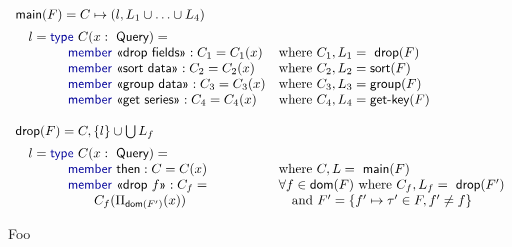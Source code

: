 \documentclass[a4paper,UKenglish]{lipics-v2016}
\newcommand{\kvd}[1]{\textnormal{\textcolor{kvdclr}{\sffamily #1}}}
\newcommand{\ident}[1]{\textnormal{\sffamily #1}}
\newcommand{\qident}[1]{\textnormal{\sffamily \guillemotleft #1\guillemotright}}
\newcommand{\dom}{\ident{dom}}
\begin{document}
\begin{figure}
\begin{equation*}
\begin{array}{ll}
\ident{main}(F) = C \mapsto (l, L_1 \cup \ldots \cup L_4)\\[0.5em]
\quad l = \kvd{type}~C(x:\ident{Query}) = \\
\qquad \qquad \kvd{member}~\qident{drop fields} : C_1 = C_1(x) &\textnormal{where}~C_1, L_1 = \ident{drop}(F)\\
\qquad \qquad \kvd{member}~\qident{sort data} : C_2 = C_2(x) &\textnormal{where}~C_2, L_2 = \ident{sort}(F)\\
\qquad \qquad \kvd{member}~\qident{group data} : C_3 = C_3(x) &\textnormal{where}~C_3, L_3 = \ident{group}(F)\\
\qquad \qquad \kvd{member}~\qident{get series} : C_4 = C_4(x) &\textnormal{where}~C_4, L_4 = \ident{get-key}(F)\\
\\
\ident{drop}(F) = C, \{l\} \cup \bigcup L_f\\[0.5em]
\quad l = \kvd{type}~C(x:\ident{Query}) = \\
\qquad \qquad \kvd{member}~\ident{then} : C = C(x)                 &\textnormal{where}~C, L = \ident{main}(F)\\
\qquad \qquad \kvd{member}~\qident{drop $f$} : C_f = &\forall f \in \dom(F)~\textnormal{where}~C_f, L_f = \ident{drop}(F')\\
\qquad \qquad \qquad  C_f(\Pi_{\ident{dom}(F')}(x))& \quad\textnormal{and}~ F' = \{ f'\mapsto\tau'\in F, f' \neq f\}\\
\end{array}
\end{equation*}

\caption{Foo}
\label{fig:foo}
\end{figure}
\end{document}
